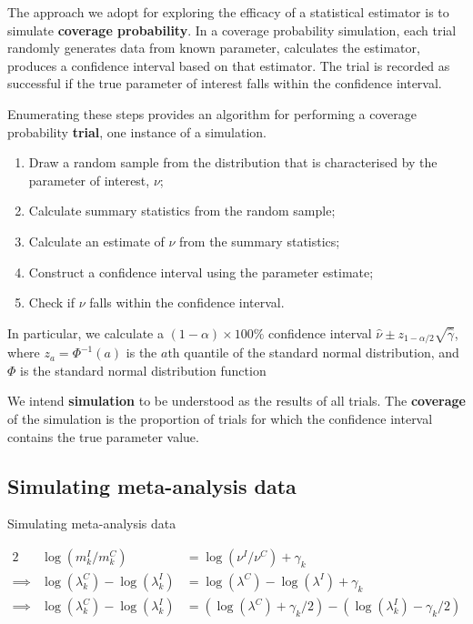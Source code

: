 \documentclass{article}
\begin{document}
The approach we adopt for exploring the efficacy of a statistical estimator is to simulate \textbf{coverage probability}. In a coverage probability simulation, each trial randomly generates data from known parameter, calculates the estimator, produces a confidence interval based on that estimator. The trial is recorded as successful if the true parameter of interest falls within the confidence interval.

Enumerating these steps provides an algorithm for performing a coverage probability \textbf{trial}, one instance of a simulation.

\begin{enumerate}
 \item Draw a random sample from the distribution that is characterised by the parameter of interest, $\nu$;
 \item Calculate summary statistics from the random sample;
 \item Calculate an estimate of $\nu$ from the summary statistics;
 \item Construct a confidence interval using the parameter estimate;
 \item Check if $\nu$ falls within the confidence interval.
\end{enumerate}

In particular, we calculate a $(1-\alpha)\times100\%$ confidence interval $\hat{\nu}\pm z_{1-\alpha/2}\sqrt{\hat{\gamma}}$, where $z_{a}=\Phi^{-1}\left(a\right)$ is the $a\text{th}$ quantile of the standard normal distribution, and $\Phi$ is the standard normal distribution function

We intend \textbf{simulation} to be understood as the results of all trials.   The \textbf{coverage} of the simulation is the proportion of trials for which the confidence interval contains the true parameter value.



\subsection{Simulating meta-analysis data}


Simulating meta-analysis data

\begin{alignat*}{2}
\, & \log(m_k^I/m_k^C) & = \log(\nu^I/\nu^C) + \gamma_k\\
\implies & \log(\lambda_k^C) - \log(\lambda_k^I) & = \log(\lambda^C) - \log(\lambda^I) + \gamma_k\\
\implies & \log(\lambda_k^C) - \log(\lambda_k^I) & = (\log(\lambda^C) + \gamma_k/2) - (\log(\lambda_k^I) - \gamma_k/2)
\end{alignat*}
\end{document}
